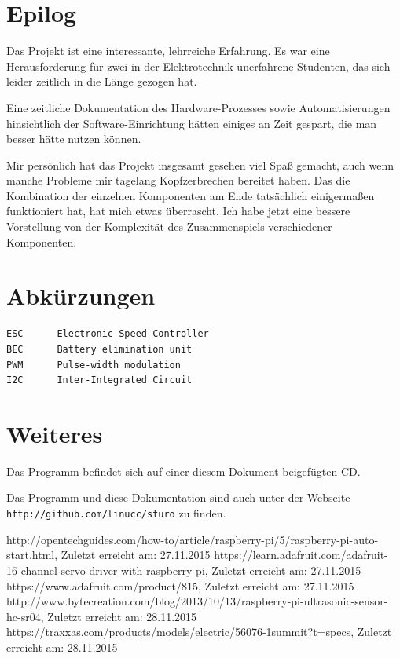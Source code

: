 \documentclass[a4paper,10pt]{scrartcl}
\begin{document}
  \section{Epilog}

    Das Projekt ist eine interessante, lehrreiche Erfahrung.
    Es war eine Herausforderung für zwei in der Elektrotechnik unerfahrene
    Studenten, das sich leider zeitlich in die Länge gezogen hat.

    Eine zeitliche Dokumentation des Hardware-Prozesses sowie Automatisierungen
    hinsichtlich der Software-Einrichtung hätten einiges an Zeit gespart, die
    man besser hätte nutzen können.

    Mir persönlich hat das Projekt insgesamt gesehen viel Spaß gemacht, auch
    wenn manche Probleme mir tagelang Kopfzerbrechen bereitet haben.
    Das die Kombination der einzelnen Komponenten am Ende tatsächlich
    einigermaßen funktioniert hat, hat mich etwas überrascht.
    Ich habe jetzt eine bessere Vorstellung von der Komplexität des
    Zusammenspiels verschiedener Komponenten.

\newpage

\section*{Abkürzungen}
  \begin{lstlisting}
ESC      Electronic Speed Controller
BEC      Battery elimination unit
PWM      Pulse-width modulation
I2C      Inter-Integrated Circuit
  \end{lstlisting}

\section*{Weiteres}

  Das Programm befindet sich auf einer diesem Dokument beigefügten CD.

  Das Programm und diese Dokumentation sind auch unter der Webseite \newline
  \lstinline{http://github.com/linucc/sturo} zu finden.

\begin{thebibliography}{9}
    http://opentechguides.com/how-to/article/raspberry-pi/5/raspberry-pi-auto-start.html,
    Zuletzt erreicht am: 27.11.2015
    https://learn.adafruit.com/adafruit-16-channel-servo-driver-with-raspberry-pi,
    Zuletzt erreicht am: 27.11.2015
    https://www.adafruit.com/product/815,
    Zuletzt erreicht am: 27.11.2015
    http://www.bytecreation.com/blog/2013/10/13/raspberry-pi-ultrasonic-sensor-hc-sr04,
    Zuletzt erreicht am: 28.11.2015
    https://traxxas.com/products/models/electric/56076-1summit?t=specs,
    Zuletzt erreicht am: 28.11.2015
\end{thebibliography}
\end{document}
